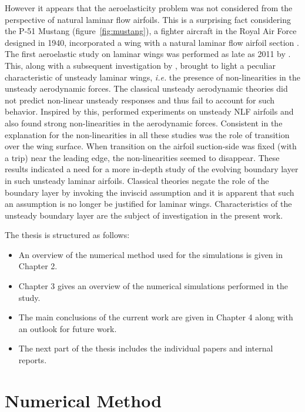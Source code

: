 However it appears that the aeroelasticity problem was not considered from the perspective of natural laminar flow airfoils. This is a surprising fact considering the P-51 Mustang (figure~\ref{fig:mustang}), a fighter aircraft in the Royal Air Force designed in 1940, incorporated a wing with a natural laminar flow airfoil section \citep{green08}. The first aeroelastic study on laminar wings was performed as late as 2011 by \cite{mai11}. This, along with a subsequent investigation by \cite{hebler13}, brought to light a peculiar characteristic of unsteady laminar wings, \textit{i.e.} the presence of non-linearities in the unsteady aerodynamic forces. The classical unsteady aerodynamic theories did not predict non-linear unsteady responses and thus fail to account for such behavior. Inspired by this, \cite{lokattthesis} performed experiments on unsteady NLF airfoils and also found strong non-linearities in the aerodynamic forces. Consistent in the explanation for the non-linearities in all these studies was the role of transition over the wing surface. When transition on the airfoil suction-side was fixed (with a trip) near the leading edge, the non-linearities seemed to disappear. These results indicated a need for a more in-depth study of the evolving boundary layer in such unsteady laminar airfoils. Classical theories negate the role of the boundary layer by invoking the inviscid assumption and it is apparent that such an assumption is no longer be justified for laminar wings. Characteristics of the unsteady boundary layer are the subject of investigation in the present work.

\thesisstructure The thesis is structured as follows:
\begin{itemize}
	\item An overview of the numerical method used for the simulations is given in Chapter 2.
	\item Chapter 3 gives an overview of the numerical simulations performed in the study.
	\item The main conclusions of the current work are given in Chapter 4 along with an outlook for future work.
	\item The next part of the thesis includes the individual papers and internal reports. 
\end{itemize}

\chapter{Numerical Method}

